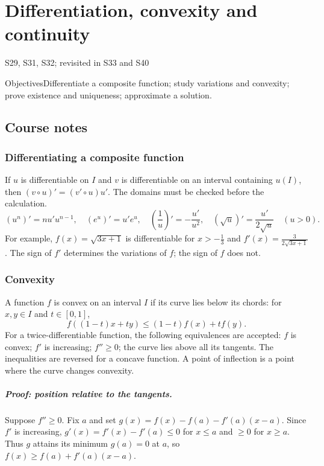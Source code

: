\setcounter{chapter}{3}\chapter{Differentiation, convexity and continuity}\label{ch:4}

{\small\sffamily\color{teal}S29, S31, S32; revisited in S33 and S40\par}

\begin{retenir}{Objectives}Differentiate a composite function; study variations and convexity; prove existence and uniqueness; approximate a solution.\end{retenir}

\section{Course notes}
\subsection{Differentiating a composite function}
If $u$ is differentiable on $I$ and $v$ is differentiable on an interval containing $u(I)$, then $(v\circ u)'=(v'\circ u)u'$. The domains must be checked before the calculation.
\[ (u^n)'=nu'u^{n-1},\quad(e^u)'=u'e^u,\quad
(\frac{1}{u})'=-\frac{u'}{u^2},\quad(\sqrt u)'=\frac{u'}{2\sqrt u}\quad(u>0).\]
For example, $f(x)=\sqrt{3x+1}$ is differentiable for $x>-\frac{1}{3}$ and $f'(x)=\frac{3}{2\sqrt{3x+1}}$. The sign of $f'$ determines the variations of $f$; the sign of $f$ does not.
\subsection{Convexity}
A function $f$ is convex on an interval $I$ if its curve lies below its chords: for $x,y\in I$ and $t\in[0,1]$,
\[f((1-t)x+ty)\le(1-t)f(x)+tf(y).\]
For a twice-differentiable function, the following equivalences are accepted: $f$ is convex; $f'$ is increasing; $f''\ge0$; the curve lies above all its tangents. The inequalities are reversed for a concave function. A point of inflection is a point where the curve changes convexity.
\paragraph{Proof: position relative to the tangents.} Suppose $f''\ge0$. Fix $a$ and set $g(x)=f(x)-f(a)-f'(a)(x-a)$. Since $f'$ is increasing, $g'(x)=f'(x)-f'(a)\le0$ for $x\le a$ and $\ge0$ for $x\ge a$. Thus $g$ attains its minimum $g(a)=0$ at $a$, so $f(x)\ge f(a)+f'(a)(x-a)$.
